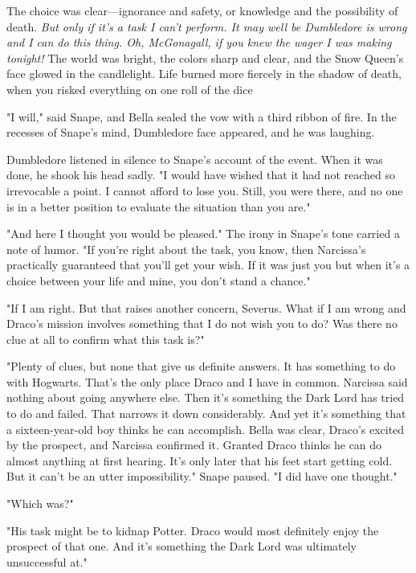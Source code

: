 The choice was clear—ignorance and safety, or knowledge and the possibility of death. \emph{But only if it's a task I can't perform. It may well be Dumbledore is wrong and I can do this thing. Oh, McGonagall, if you knew the wager I was making tonight!} The world was bright, the colors sharp and clear, and the Snow Queen's face glowed in the candlelight. Life burned more fiercely in the shadow of death, when you risked everything on one roll of the dice{\el}

"I will," said Snape, and Bella sealed the vow with a third ribbon of fire. In the recesses of Snape's mind, Dumbledore face appeared, and he was laughing.

\sbreak

Dumbledore listened in silence to Snape's account of the event. When it was done, he shook his head sadly. "I would have wished that it had not reached so irrevocable a point. I cannot afford to lose you. Still, you were there, and no one is in a better position to evaluate the situation than you are."

"And here I thought you would be pleased." The irony in Snape's tone carried a note of humor. "If you're right about the task, you know, then Narcissa's practically guaranteed that you'll get your wish. If it was just you{\el} but when it's a choice between your life and mine, you don't stand a chance."

"If I am right. But that raises another concern, Severus. What if I am wrong and Draco's mission involves something that I do not wish you to do? Was there no clue at all to confirm what this task is?"

"Plenty of clues, but none that give us definite answers. It has something to do with Hogwarts. That's the only place Draco and I have in common. Narcissa said nothing about going anywhere else. Then it's something the Dark Lord has tried to do and failed. That narrows it down considerably. And yet it's something that a sixteen-year-old boy thinks he can accomplish. Bella was clear, Draco's excited by the prospect, and Narcissa confirmed it. Granted Draco thinks he can do almost anything at first hearing. It's only later that his feet start getting cold. But it can't be an utter impossibility." Snape paused. "I did have one thought."

"Which was?"

"His task might be to kidnap Potter. Draco would most definitely enjoy the prospect of that one. And it's something the Dark Lord was ultimately unsuccessful at."

